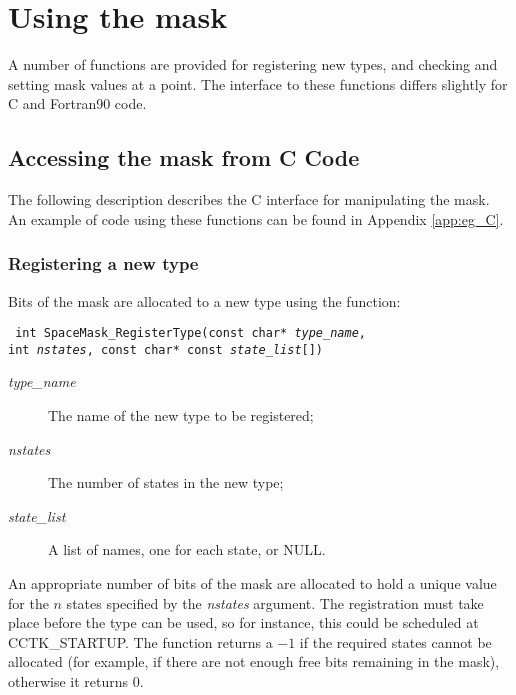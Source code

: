 \documentclass{article}
\begin{document}
\section{Using the mask}

A number of functions are provided for registering new types, and
checking and setting mask values at a point. The interface to these
functions differs slightly for C and Fortran90 code.

\subsection{Accessing the mask from C Code}

The following description describes the C interface for manipulating
the mask. An example of code using these functions can be found in
Appendix \ref{app:eg_C}.

\subsubsection{Registering a new type}\label{sec:reg_C}

Bits of the mask are allocated to a new type using the function:

\indent\parbox{\linewidth}{
\vspace{\baselineskip}\noindent\texttt{
int SpaceMask\_RegisterType(const char* \emph{type\_name},
  \\\hspace*{10mm}
  int \emph{nstates}, const char* const \emph{state\_list}[])
}\\
\hspace*{10mm}\parbox{\linewidth}{
\begin{description}
  \item[\emph{type\_name}] The name of the new type to be registered;
  \item[\emph{nstates}] The number of states in the new type;
  \item[\emph{state\_list}] A list of names, one for each state, or NULL.
\end{description}
}
}

\noindent An appropriate number of bits of the mask are allocated to
hold a unique value for the $n$ states specified by the \emph{nstates}
argument. The registration must take place before the type can be
used, so for instance, this could be scheduled at CCTK\_STARTUP. The
function returns a $-1$ if the required states cannot be allocated
(for example, if there are not enough free bits remaining in the
mask), otherwise it returns $0$.
\end{document}

